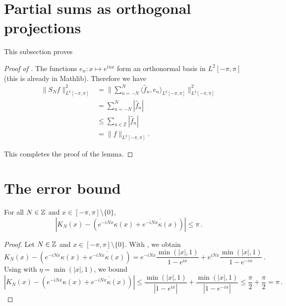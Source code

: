 \section{Partial sums as orthogonal projections}
\label{10projection}

This subsection proves 

\begin{proof}[Proof of ]
\leanok

The functions $e_n:x\mapsto e^{inx}$ form an orthonormal basis in $L^2[-\pi, \pi]$
(this is already in Mathlib).
Therefore we have
\begin{align*}
    \|S_Nf\|^2_{L^2[-\pi, \pi]}
    &= \|\sum_{n=-N}^N \langle\widehat{f}_n, e_n\rangle_{L^2[-\pi, \pi]}\|^2_{L^2[-\pi, \pi]} \\
    &= \sum_{n=-N}^N |\widehat{f}_n| \\
    &\le \sum_{n\in \mathbb{Z}} |\widehat{f}_n| \\
    &= \|f\|_{L^2[-\pi, \pi]}.
\end{align*}

This completes the proof of the lemma.
\end{proof}

\section{The error bound}
\label{10difference}

\begin{lemma}
    \label{Dirichlet-Hilbert}
    \leanok
    For all $N\in{\mathbb{Z}}$ and $x\in [-\pi,\pi] \setminus \{0\}$,
    \begin{equation*}
        \left|K_N(x) - (e^{-iNx}\kappa(x) + \overline{e^{-iNx}\kappa(x)})\right| \le \pi \,.
    \end{equation*}
\end{lemma}

\begin{proof}
    \leanok
    Let $N\in{\mathbb{Z}}$ and $x\in [-\pi,\pi] \setminus \{0\}$. With , we obtain
    \begin{equation*}
        K_N(x) - (e^{-iNx}\kappa(x) + \overline{e^{-iNx}\kappa(x)})
        = e^{-iNx} \frac{\min(|x|, 1) }{1 - e^{ix}} + e^{iNx} \frac{\min(|x|, 1) }{1 - e^{-ix}} \,.
    \end{equation*}
    Using  with $\eta = \min(|x|, 1)$, we bound
    \begin{equation*}
        \left|K_N(x) - (e^{-iNx}\kappa(x) + \overline{e^{-iNx}\kappa(x)})\right|
        \le \frac{\min(|x|, 1) }{|1 - e^{ix}|} + \frac{\min(|x|, 1)}{|1 - e^{-ix}|}
        \le \frac{\pi}{2} + \frac{\pi}{2} = \pi \,.
    \end{equation*}
\end{proof}

